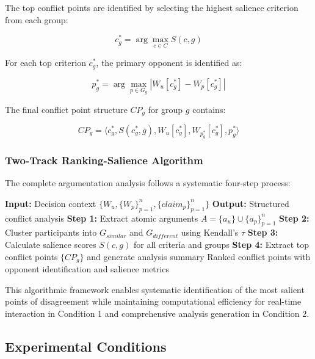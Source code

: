 \documentclass[conference]{IEEEtran}
\begin{document}
The top conflict points are identified by selecting the highest salience criterion from each group:

\begin{equation}
c^*_g = \arg\max_{c \in C} S(c, g)
\end{equation}

For each top criterion $c^*_g$, the primary opponent is identified as:

\begin{equation}
p^*_g = \arg\max_{p \in G_g} |W_u[c^*_g] - W_p[c^*_g]|
\end{equation}

The final conflict point structure $CP_g$ for group $g$ contains:

\begin{equation}
CP_g = \langle c^*_g, S(c^*_g, g), W_u[c^*_g], W_{p^*_g}[c^*_g], p^*_g \rangle
\end{equation}

\subsubsection{Two-Track Ranking-Salience Algorithm}

The complete argumentation analysis follows a systematic four-step process:

\begin{algorithm}
\caption{Two-Track Ranking-Salience Analysis}
\begin{algorithmic}
\STATE \textbf{Input:} Decision context $\{W_u, \{W_p\}_{p=1}^n, \{claim_p\}_{p=1}^n\}$
\STATE \textbf{Output:} Structured conflict analysis
\STATE 
\STATE \textbf{Step 1:} Extract atomic arguments $A = \{a_u\} \cup \{a_p\}_{p=1}^n$
\STATE \textbf{Step 2:} Cluster participants into $G_{similar}$ and $G_{different}$ using Kendall's $\tau$
\STATE \textbf{Step 3:} Calculate salience scores $S(c,g)$ for all criteria and groups
\STATE \textbf{Step 4:} Extract top conflict points $\{CP_g\}$ and generate analysis summary
\STATE 
\RETURN Ranked conflict points with opponent identification and salience metrics
\end{algorithmic}
\end{algorithm}

This algorithmic framework enables systematic identification of the most salient points of disagreement while maintaining computational efficiency for real-time interaction in Condition 1 and comprehensive analysis generation in Condition 2.

\subsection{Experimental Conditions}
\end{document}
